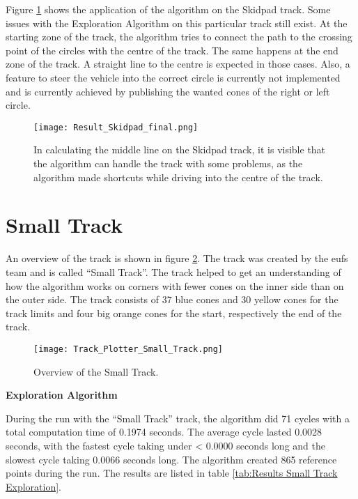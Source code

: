 Figure \ref{fig:Result Skidpad Final} shows the application of the algorithm on the Skidpad track. Some issues with the Exploration Algorithm on this particular track still exist. At the starting zone of the track, the algorithm tries to connect the path to the crossing point of the circles with the centre of the track. The same happens at the end zone of the track. A straight line to the centre is expected in those cases. Also, a feature to steer the vehicle into the correct circle is currently not implemented and is currently achieved by publishing the wanted cones of the right or left circle.
\begin{figure}[H]
    \centering
    \texttt{[image: Result\_Skidpad\_final.png]}
    \caption{In calculating the middle line on the Skidpad track, it is visible that the algorithm can handle the track with some problems, as the algorithm made shortcuts while driving into the centre of the track.}
    \label{fig:Result Skidpad Final}
\end{figure}

\pagebreak

\section{Small Track} \label{sec:Results Small Track}
An overview of the track is shown in figure \ref{fig:Results Small Track Initial}. The track was created by the \acrshort{eufs} team and is called ``Small Track''. \cite{eufs_sim_gitlab} The track helped to get an understanding of how the algorithm works on corners with fewer cones on the inner side than on the outer side. The track consists of 37 blue cones and 30 yellow cones for the track limits and four big orange cones for the start, respectively the end of the track.
\begin{figure}[H]
    \centering
    \texttt{[image: Track\_Plotter\_Small\_Track.png]}
    \caption{Overview of the Small Track.}
    \label{fig:Results Small Track Initial}
\end{figure}

\textbf{Exploration Algorithm}

During the run with the ``Small Track'' track, the algorithm did 71 cycles with a total computation time of 0.1974 seconds. The average cycle lasted 0.0028 seconds, with the fastest cycle taking under < 0.0000 seconds long and the slowest cycle taking 0.0066 seconds long. The algorithm created 865 reference points during the run. The results are listed in table \ref{tab:Results Small Track Exploration}.

